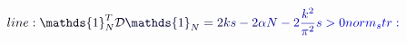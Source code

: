 \documentclass[12pt]{article}
\begin{document}
\makeatletter
\renewcommand*{\@textcolor}[3]{%
  \protect\leavevmode
  \begingroup
    \color#1{#2}#3%
  \endgroup
}
\makeatother
\begin{displaymath}
\mathcolor[RGB]{0,0,15}{line:
\mathds{1}_N^T} \mathcolor[RGB]{0,0,30}{\mathcal{D}} \mathcolor[RGB]{0,0,45}{\mathds{1}_N} \mathcolor[RGB]{0,0,60}{=} \mathcolor[RGB]{0,0,75}{2k} \mathcolor[RGB]{0,0,90}{s} \mathcolor[RGB]{0,0,105}{-} \mathcolor[RGB]{0,0,120}{2\alpha} \mathcolor[RGB]{0,0,135}{N} \mathcolor[RGB]{0,0,150}{-} \mathcolor[RGB]{0,0,165}{2\frac{k^2}{\pi^2}} \mathcolor[RGB]{0,0,180}{s} \mathcolor[RGB]{0,0,195}{>} \mathcolor[RGB]{0,0,210}{0

norm_str:}
\end{displaymath}
\end{document}
